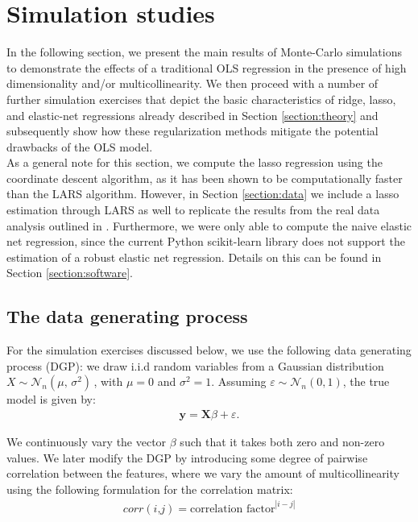 \section{Simulation studies}
\label{section:simulation}

\noindent In the following section, we present the main results of Monte-Carlo simulations to demonstrate the effects of a traditional OLS regression in the presence of high dimensionality and/or multicollinearity. We then proceed with a number of further simulation exercises that depict the basic characteristics of ridge, lasso, and elastic-net regressions already described in Section \ref{section:theory} and subsequently show how these regularization methods mitigate the potential drawbacks of the OLS model. \\

\noindent As a general note for this section, we compute the lasso regression using the coordinate descent algorithm, as it has been shown to be computationally faster than the LARS algorithm. However, in Section \ref{section:data} we include a lasso estimation through LARS as well to replicate the results from the real data analysis outlined in \cite{zou2005regularization}. Furthermore, we were only able to compute the naive elastic net regression, since the current Python scikit-learn library does not support the estimation of a robust elastic net regression. Details on this can be found in Section \ref{section:software}.

\subsection{The data generating process}

For the simulation exercises discussed below, we use the following data generating process (DGP): we draw i.i.d random variables from a Gaussian distribution $X \sim \mathcal{N}_{n}(\mu,\,\sigma^{2})\,$, with $\mu=0$ and $\sigma^{2}=1$. Assuming $\varepsilon \sim \mathcal{N}_{n}(0, 1)$, the true model is given by: 
\begin{align}
\label{eqn:truemodel}
\mathbf{y}= \mathbf{X}\beta + \varepsilon.
\end{align}

\noindent We continuously vary the vector $\beta$ such that it takes both zero and non-zero values. We later modify the DGP by introducing some degree of pairwise correlation between the features, where we vary the amount of multicollinearity using the following formulation for the correlation matrix:  
\begin{align}
\label{eqn:corrmatrix}
corr(\textit{i,j}) = \text{correlation factor} ^ \left|{i - j}\right|
\end{align}
        

